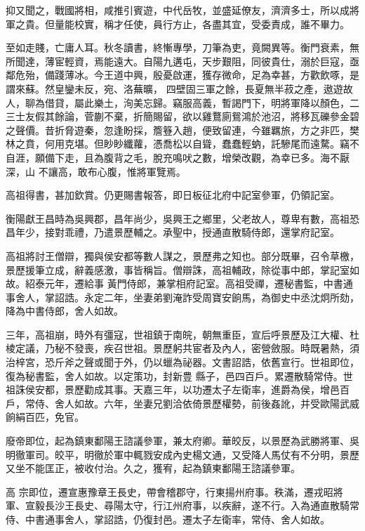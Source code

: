 \begin{pinyinscope}
 抑又聞之，戰國將相，咸推引賓遊，中代岳牧，並盛延僚友，濟濟多士，所以成將軍之貴。但量能校實，稱才任使，員行方止，各盡其宜，受委責成，誰不畢力。



 至如走賤，亡庸人耳。秋冬讀書，終慚專學，刀筆為吏，竟闕異等。衡門衰素，無所聞達，薄宦輕資，焉能遠大。自陽九遘屯，天步艱阻，同彼貴仕，溺於巨寇，亟鄰危殆，備踐薄冰。今王道中興，殷憂啟運，獲存微命，足為幸甚，方歡飲啄，是謂來蘇。然皇鑾未反，宛、洛蕪曠，
 四壁固三軍之餘，長夏無半菽之產，遨遊故人，聊為借貸，屬此樂土，洵美忘歸。竊服高義，暫謁門下，明將軍降以顏色，二三士友假其餘論，菅蒯不棄，折簡賜留，欲以雞鶩廁鴛鴻於池沼，將移瓦礫參金碧之聲價。昔折脅遊秦，忽逢盼採，簷簦入趙，便致留連，今雖羈旅，方之非匹，樊林之賁，何用克堪。但眇眇纖蘿，憑喬松以自聳，蠢蠢輕蚋，託驂尾而遠騖。竊不自涯，願備下走，且為腹背之毛，脫充鳴吠之數，增榮改觀，為幸已多。海不厭深，山
 不讓高，敢布心腹，惟將軍覽焉。



 高祖得書，甚加欽賞。仍更賜書報答，即日板征北府中記室參軍，仍領記室。



 衡陽獻王昌時為吳興郡，昌年尚少，吳興王之鄉里，父老故人，尊卑有數，高祖恐昌年少，接對乖禮，乃遣景歷輔之。承聖中，授通直散騎侍郎，還掌府記室。



 高祖將討王僧辯，獨與侯安都等數人謀之，景歷弗之知也。部分既畢，召令草檄，景歷援筆立成，辭義感激，事皆稱旨。僧辯誅，高祖輔政，除從事中郎，掌記室如故。紹泰元年，遷給事
 黃門侍郎，兼掌相府記室。高祖受禪，遷秘書監，中書通事舍人，掌詔誥。永定二年，坐妻弟劉淹詐受周寶安餉馬，為御史中丞沈炯所劾，降為中書侍郎，舍人如故。



 三年，高祖崩，時外有彊寇，世祖鎮于南皖，朝無重臣，宣后呼景歷及江大權、杜棱定議，乃秘不發喪，疾召世祖。景歷躬共宦者及內人，密營斂服。時既暑熱，須治梓宮，恐斤斧之聲或聞于外，仍以蠟為祕器。文書詔誥，依舊宣行。世祖即位，復為秘書監，舍人如故。以定策功，封新豊
 縣子，邑四百戶。累遷散騎常侍。世祖誅侯安都，景歷勸成其事。天嘉三年，以功遷太子左衛率，進爵為侯，增邑百戶，常侍、舍人如故。六年，坐妻兄劉洽依倚景歷權勢，前後姦訛，并受歐陽武威餉絹百匹，免官。



 廢帝即位，起為鎮東鄱陽王諮議參軍，兼太府卿。華皎反，以景歷為武勝將軍、吳明徹軍司。皎平，明徹於軍中輒戮安成內史楊文通，又受降人馬仗有不分明，景歷又坐不能匡正，被收付治。久之，獲宥，起為鎮東鄱陽王諮議參軍。



 高
 宗即位，遷宣惠豫章王長史，帶會稽郡守，行東揚州府事。秩滿，遷戎昭將軍、宣毅長沙王長史、尋陽太守，行江州府事，以疾辭，遂不行。入為通直散騎常侍、中書通事舍人，掌詔誥，仍復封邑。遷太子左衛率，常侍、舍人如故。




\end{pinyinscope}
